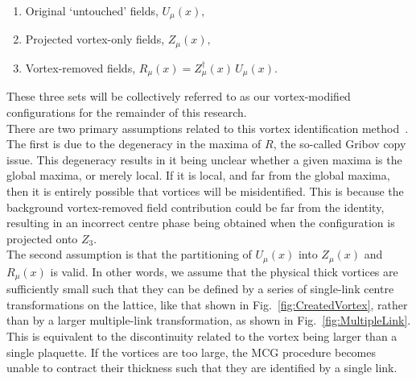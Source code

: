 \begin{enumerate}
\item Original `untouched' fields, $U_{\mu}(x),$

\item Projected vortex-only fields, $Z_{\mu}(x),$

\item Vortex-removed fields, $R_\mu(x) = Z^{\dagger}_{\mu}(x)\,U_{\mu}(x).$
\end{enumerate}
These three sets will be collectively referred to as our vortex-modified configurations for the remainder of this research.\\

There are two primary assumptions related to this vortex identification method~\cite{Faber:1999gu}. The first is due to the degeneracy in the maxima of $R$, the so-called Gribov copy issue. This degeneracy results in it being unclear whether a given maxima is the global maxima, or merely local. If it is local, and far from the global maxima, then it is entirely possible that vortices will be misidentified. This is because the background vortex-removed field contribution could be far from the identity, resulting in an incorrect centre phase being obtained when the configuration is projected onto $Z_3$.\\

The second assumption is that the partitioning of $U_\mu(x)$ into $Z_\mu(x)$ and $R_\mu(x)$ is valid. In other words, we assume that the physical thick vortices are sufficiently small such that they can be defined by a series of single-link centre transformations on the lattice, like that shown in Fig.~\ref{fig:CreatedVortex}, rather than by a larger multiple-link transformation, as shown in Fig.~\ref{fig:MultipleLink}. This is equivalent to the discontinuity related to the vortex being larger than a single plaquette. If the vortices are too large, the MCG procedure becomes unable to contract their thickness such that they are identified by a single link.\\

